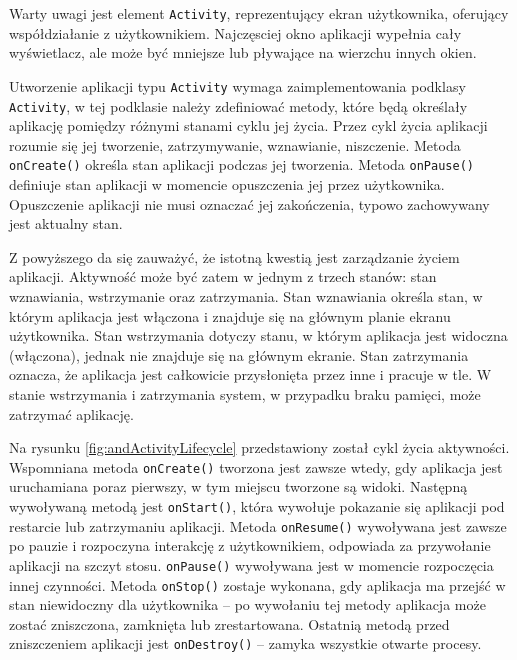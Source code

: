 \documentclass[eng,printmode,oneside]{mgr}
\begin{document}
Warty uwagi jest element \texttt{Activity}, reprezentujący ekran użytkownika,
oferujący współdziałanie z użytkownikiem. Najczęsciej okno aplikacji wypełnia
cały wyświetlacz, ale może być mniejsze lub pływające na wierzchu innych okien.

Utworzenie aplikacji typu \texttt{Activity} wymaga zaimplementowania podklasy
\texttt{Activity}, w tej podklasie należy zdefiniować metody, które będą
określały aplikację pomiędzy różnymi stanami cyklu jej życia. Przez cykl życia
aplikacji rozumie się jej tworzenie, zatrzymywanie, wznawianie, niszczenie.
Metoda \texttt{onCreate()} określa stan aplikacji podczas jej tworzenia. Metoda
\texttt{onPause()} definiuje stan aplikacji w momencie opuszczenia jej przez
użytkownika. Opuszczenie aplikacji nie musi oznaczać jej zakończenia, typowo
zachowywany jest aktualny stan.

Z powyższego da się zauważyć, że istotną kwestią jest zarządzanie życiem
aplikacji. Aktywność może być zatem w jednym z trzech stanów: stan wznawiania,
wstrzymanie oraz zatrzymania. Stan wznawiania określa stan, w którym aplikacja
jest włączona i znajduje się na głównym planie ekranu użytkownika. Stan
wstrzymania dotyczy stanu, w którym aplikacja jest widoczna (włączona), jednak
nie znajduje się na głównym ekranie. Stan zatrzymania oznacza, że aplikacja jest
całkowicie przysłonięta przez inne i pracuje w tle. W stanie wstrzymania i
zatrzymania system, w przypadku braku pamięci, może zatrzymać aplikację.

Na rysunku \ref{fig:andActivityLifecycle} przedstawiony został cykl życia
aktywności. Wspomniana metoda \texttt{onCreate()} tworzona jest zawsze wtedy,
gdy aplikacja jest uruchamiana poraz pierwszy, w tym miejscu tworzone są widoki.
Następną wywoływaną metodą jest \texttt{onStart()}, która wywołuje pokazanie się
aplikacji pod restarcie lub zatrzymaniu aplikacji. Metoda \texttt{onResume()} wywoływana jest
zawsze po pauzie i rozpoczyna interakcję z użytkownikiem, odpowiada za
przywołanie aplikacji na szczyt stosu. \texttt{onPause()} wywoływana jest w
momencie rozpoczęcia innej czynności. Metoda \texttt{onStop()} zostaje
wykonana, gdy aplikacja ma przejść w stan niewidoczny dla użytkownika -- po
wywołaniu tej metody aplikacja może zostać zniszczona, zamknięta lub zrestartowana.
Ostatnią metodą przed zniszczeniem aplikacji jest \texttt{onDestroy()} -- zamyka
wszystkie otwarte procesy.
\end{document}
